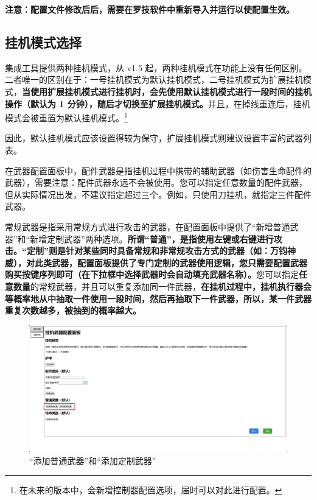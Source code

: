 \textbf{\color{red}注意：配置文件修改后后，需要在罗技软件中重新导入并运行以使配置生效。}

\subsection{挂机模式选择}

集成工具提供两种挂机模式，从 v1.5 起，两种挂机模式在功能上没有任何区别。二者唯一的区别在于：一号挂机模式为默认挂机模式，二号挂机模式为扩展挂机模式，\textbf{当使用扩展挂机模式进行挂机时，会先使用默认挂机模式进行一段时间的挂机操作（默认为 1 分钟），随后才切换至扩展挂机模式。}并且，在掉线重连后，挂机模式会被重置为默认挂机模式。\footnote{在未来的版本中，会新增控制器配置选项，届时可以对此进行配置。}

因此，默认挂机模式应该设置得较为保守，扩展挂机模式则建议设置丰富的武器列表。

在武器配置面板中，配件武器是指挂机过程中携带的辅助武器（如伤害生命配件的武器），需要注意：配件武器永远不会被使用。您可以指定任意数量的配件武器，但从实际情况出发，不建议指定超过三个。例如，只使用刀挂机，就指定三件配件武器。

常规武器是指采用常规方式进行攻击的武器，在配置面板中提供了“新增普通武器”和“新增定制武器”两种选项。\textbf{\color{red}所谓“普通”，是指使用左键或右键进行攻击。“定制”则是针对某些同时具备常规和非常规攻击方式的武器（如：万钧神威），对此类武器，配置面板提供了专门定制的武器使用逻辑，您只需要配置武器购买按键序列即可（在下拉框中选择武器时会自动填充武器名称）。}您可以指定\textbf{\color{red}任意数量}的常规武器，并且可以重复添加同一件武器，\textbf{在挂机过程中，挂机执行器会等概率地从中抽取一件使用一段时间，然后再抽取下一件武器，所以，某一件武器重复次数越多，被抽到的概率越大。}

\begin{figure}[H]
    \Centering
    \includegraphics[width=\textwidth]{documents/assets/about_conventional_weapons}
    \caption{“添加普通武器”和“添加定制武器”}
\end{figure}

